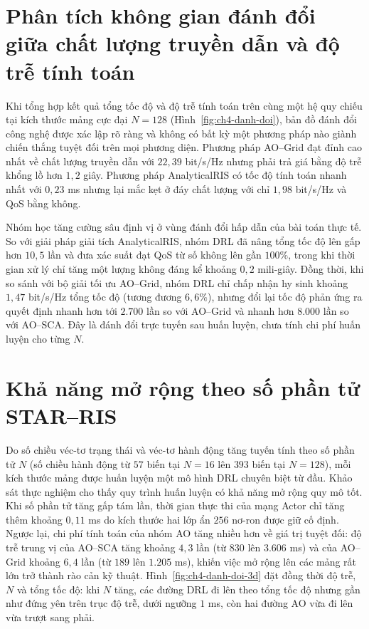 \section{Phân tích không gian đánh đổi giữa chất lượng truyền dẫn và độ trễ tính toán}
\label{sec:danh-doi}

Khi tổng hợp kết quả tổng tốc độ và độ trễ tính toán trên cùng một hệ quy chiếu tại kích thước mảng cực đại
$N = 128$ (Hình~\ref{fig:ch4-danh-doi}), bản đồ đánh đổi công nghệ được xác lập rõ ràng và không có bất kỳ một
phương pháp nào giành chiến thắng tuyệt đối trên mọi phương diện. Phương pháp AO--Grid đạt đỉnh cao nhất về chất
lượng truyền dẫn với $22,39$ bit/s/Hz nhưng phải trả giá bằng độ trễ khổng lồ hơn $1,2$ giây. Phương pháp
AnalyticalRIS có tốc độ tính toán nhanh nhất với $0,23$ ms nhưng lại mắc kẹt ở đáy chất lượng với chỉ $1,98$
bit/s/Hz và QoS bằng không.



Nhóm học tăng cường sâu định vị ở vùng đánh đổi hấp dẫn của bài toán thực tế. So với giải pháp giải tích
AnalyticalRIS, nhóm DRL đã nâng tổng tốc độ lên gấp hơn $10,5$ lần và đưa xác suất đạt QoS từ số không lên gần
$100\%$, trong khi thời gian xử lý chỉ tăng một lượng không đáng kể khoảng $0,2$ mili-giây. Đồng thời, khi so sánh
với bộ giải tối ưu AO--Grid, nhóm DRL chỉ chấp nhận hy sinh khoảng $1,47$ bit/s/Hz tổng tốc độ (tương đương
$6,6\%$), nhưng đổi lại tốc độ phản ứng ra quyết định nhanh hơn tới $2.700$ lần so với AO--Grid và nhanh hơn $8.000$
lần so với AO--SCA. Đây là đánh đổi trực tuyến sau huấn luyện, chưa tính chi phí huấn luyện cho từng $N$.

\section{Khả năng mở rộng theo số phần tử STAR--RIS}
\label{sec:kha-nang-mo-rong}

Do số chiều véc-tơ trạng thái và véc-tơ hành động tăng tuyến tính theo số phần tử $N$ (số chiều hành động từ $57$
biến tại $N = 16$ lên $393$ biến tại $N = 128$), mỗi kích thước mảng được huấn luyện một mô hình DRL chuyên biệt từ
đầu. Khảo sát thực nghiệm cho thấy quy trình huấn luyện có khả năng mở rộng quy mô tốt. Khi số phần tử tăng gấp tám
lần, thời gian thực thi của mạng Actor chỉ tăng thêm khoảng $0,11$ ms do kích thước hai lớp ẩn $256$ nơ-ron được
giữ cố định. Ngược lại, chi phí tính toán của nhóm AO tăng nhiều hơn về giá trị tuyệt đối: độ trễ trung vị của
AO--SCA tăng khoảng $4,3$ lần (từ $830$ lên $3.606$ ms) và của AO--Grid khoảng $6,4$ lần (từ $189$ lên $1.205$ ms),
khiến việc mở rộng lên các mảng rất lớn trở thành rào cản kỹ thuật. Hình~\ref{fig:ch4-danh-doi-3d} đặt đồng thời độ
trễ, $N$ và tổng tốc độ: khi $N$ tăng, các đường DRL đi lên theo tổng tốc độ nhưng gần như đứng yên trên trục độ
trễ, dưới ngưỡng $1$ ms, còn hai đường AO vừa đi lên vừa trượt sang phải.

